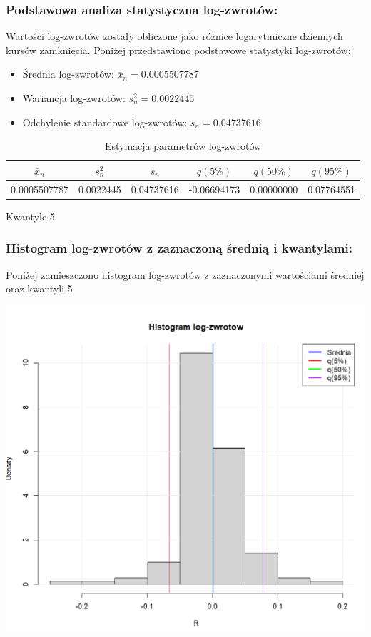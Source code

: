 \documentclass[a4paper,11pt]{article}
\begin{document}
\subsubsection{Podstawowa analiza statystyczna log-zwrotów:}

Wartości log-zwrotów zostały obliczone jako różnice logarytmiczne dziennych kursów zamknięcia. Poniżej przedstawiono podstawowe statystyki log-zwrotów:
\begin{itemize}
    \item Średnia log-zwrotów: $\overline{x}_n = 0.0005507787$
    \item Wariancja log-zwrotów: $s^2_n = 0.0022445$
    \item Odchylenie standardowe log-zwrotów: $s_n = 0.04737616$
\end{itemize}

\begin{table}[h!]
\centering
\caption{Estymacja parametrów log-zwrotów}
\begin{tabular}{|c|c|c|c|c|c|}
\hline
$\overline{x}_n$ & $s^2_n$ & $s_n$ & $q(5\%)$ & $q(50\%)$ & $q(95\%)$ \\ \hline
0.0005507787 & 0.0022445 & 0.04737616 & -0.06694173 & 0.00000000 & 0.07764551 \\ \hline
\end{tabular}
\end{table}

Kwantyle 5%

\subsubsection{Histogram log-zwrotów z zaznaczoną średnią i kwantylami:}

Poniżej zamieszczono histogram log-zwrotów z zaznaczonymi wartościami średniej oraz kwantyli 5%

\centerline{\includegraphics[width=14cm]{./Janek/histogram logzwrotow.png}}
\end{document}
